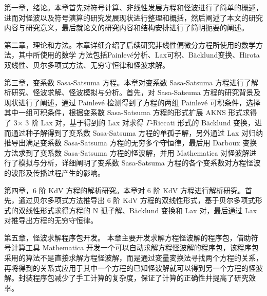第一章，绪论。本章首先对符号计算、非线性发展方程和怪波进行了简单的概述，
进而对怪波以及符号演算的研究发展现状进行整理和概括，然后阐述了本文的研究内容与研究意义，最后就论文的研究内容和结构安排进行了简明扼要的阐述。

第二章，理论和方法。本章详细介绍了后续研究非线性偏微分方程所使用的数学方法，其中所使用的数学
方法包括Painlev\'{e}分析、Lax可积、B\"{a}cklund变换、Hirota 双线性、贝尔多项式方法、无穷守恒律和怪波求解。

第三章，变系数 Sasa-Satsuma 方程。本章对变系数 Sasa-Satsuma 方程进行了解析研究、怪波求解、怪波模拟与分析。首先，对 Sasa-Satsuma 方程的研究背景及现状进行了阐述，通过 Painlev\'{e} 检测得到了方程的两组 Painlev\'{e} 可积条件，选择其中一组可积条件，根据变系数 Sasa-Satsuma 方程的形式扩展 AKNS 形式求得了 3$\times$ 3 阶 Lax 对，基于得到的 Lax 对求得 $\Gamma$-Riccati 形式的 B\"{a}cklund 变换，进而通过种子解得到了变系数 Sasa-Satsuma 方程的单孤子解，另外通过 Lax 对归纳推导出满足变系数 Sasa-Satsuma 方程的无穷多个守恒律，最后用 Darboux 变换方法求到了变系数 Sasa-Satsuma 方程的怪波解，并用 Mathematica 对怪波解进行了模拟与分析，详细阐明了变系数 Sasa-Satsuma 方程的各个变系数对方程怪波的波形及传播过程产生的影响。

第四章，6 阶 KdV 方程的解析研究。本章对 6 阶 KdV 方程进行解析研究。首先，通过贝尔多项式方法推导出 6 阶 KdV 方程的双线性形式，基于贝尔多项式形式的双线性形式求得方程的 N 孤子解、B\"{a}cklund 变换和 Lax 对，最后通过 Lax 对推导出方程的无穷守恒律。

第五章，怪波求解程序包开发。
本章主要开发求解方程怪波解的程序包，借助符号计算工具 Mathematica 开发一个可以自动求解方程怪波解的程序包，该程序包采用的算法不是直接求解方程怪波解，而是通过変量変换法寻找两个方程的关系，再将得到的关系式应用于其中一个方程的已知怪波解就可以得到另一个方程的怪波解。封装程序包减少了手工计算的复杂度，保证了计算的正确性并提高了研究效率。











